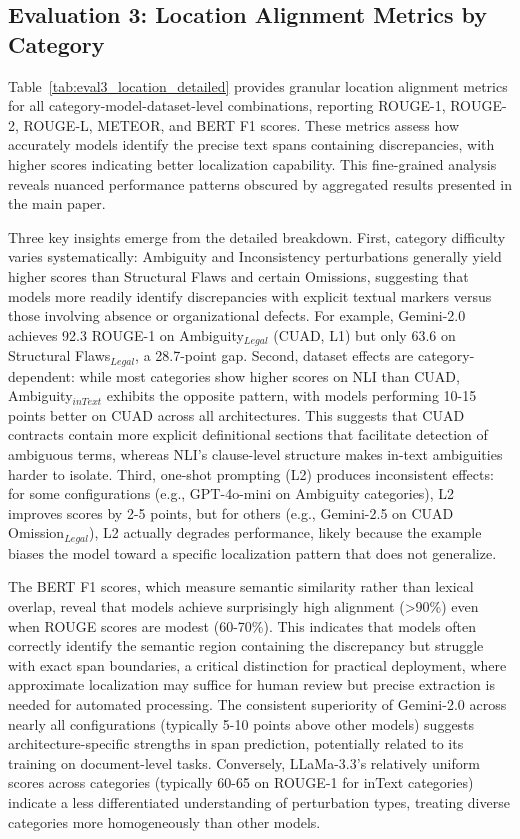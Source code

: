 \documentclass[11pt]{article}
\begin{document}
\subsection{Evaluation 3: Location Alignment Metrics by Category}
\label{sec:appendix-eval3-location}

Table~\ref{tab:eval3_location_detailed} provides granular location alignment metrics for all category-model-dataset-level combinations, reporting ROUGE-1, ROUGE-2, ROUGE-L, METEOR, and BERT F1 scores. These metrics assess how accurately models identify the precise text spans containing discrepancies, with higher scores indicating better localization capability. This fine-grained analysis reveals nuanced performance patterns obscured by aggregated results presented in the main paper.

Three key insights emerge from the detailed breakdown. First, category difficulty varies systematically: Ambiguity and Inconsistency perturbations generally yield higher scores than Structural Flaws and certain Omissions, suggesting that models more readily identify discrepancies with explicit textual markers versus those involving absence or organizational defects. For example, Gemini-2.0 achieves 92.3 ROUGE-1 on Ambiguity$_{Legal}$ (CUAD, L1) but only 63.6 on Structural Flaws$_{Legal}$, a 28.7-point gap. Second, dataset effects are category-dependent: while most categories show higher scores on NLI than CUAD, Ambiguity$_{inText}$ exhibits the opposite pattern, with models performing 10-15 points better on CUAD across all architectures. This suggests that CUAD contracts contain more explicit definitional sections that facilitate detection of ambiguous terms, whereas NLI's clause-level structure makes in-text ambiguities harder to isolate. Third, one-shot prompting (L2) produces inconsistent effects: for some configurations (e.g., GPT-4o-mini on Ambiguity categories), L2 improves scores by 2-5 points, but for others (e.g., Gemini-2.5 on CUAD Omission$_{Legal}$), L2 actually degrades performance, likely because the example biases the model toward a specific localization pattern that does not generalize.

The BERT F1 scores, which measure semantic similarity rather than lexical overlap, reveal that models achieve surprisingly high alignment (>90\%) even when ROUGE scores are modest (60-70\%). This indicates that models often correctly identify the semantic region containing the discrepancy but struggle with exact span boundaries, a critical distinction for practical deployment, where approximate localization may suffice for human review but precise extraction is needed for automated processing. The consistent superiority of Gemini-2.0 across nearly all configurations (typically 5-10 points above other models) suggests architecture-specific strengths in span prediction, potentially related to its training on document-level tasks. Conversely, LLaMa-3.3's relatively uniform scores across categories (typically 60-65 on ROUGE-1 for inText categories) indicate a less differentiated understanding of perturbation types, treating diverse categories more homogeneously than other models.
\end{document}
